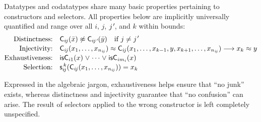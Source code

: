 Datatypes and codatatypes share many basic properties pertaining to
constructors and selectors. All properties below are implicitly universally
quantified and range over all $i$, $j$, $\jPrime$, and $k$ within bounds:
%
\[
\begin{aligned}[t]
\text{Distinctness:}\quad
  & %
    \smash{\const{C}_{i\negvthinspace j}(\bar x) \tneq \const{C}_{i\negvthinspace \jPrime}(\bar y) \quad\text{if $j \not= \jPrime$}}
  \\[-.5\jot]
\text{Injectivity:}\quad
  & %
    \smash{\const{C}_{i\negvthinspace j}(x_1,\ldots,x_{n_{i\negvthinspace j}}) \teq \const{C}_{i\negvthinspace j}(x_1,\ldots,x_{k-1},y,x_{k+1},\ldots,x_{n_{i\negvthinspace j}}) \longrightarrow x_k \teq y}
  \\[-.5\jot]
\text{Exhaustiveness:}\quad
  & \smash{\is{C}_{i1}(x) \mathrel\lor \cdots \mathrel\lor \is{C}_{im_i}(x)}
  \\[-.5\jot]
\text{Selection:}\quad
  & \smash{\const{s}_{i\negvthinspace j}^{\,k}(\const{C}_{i\negvthinspace j}(x_1,\ldots,x_{n_{i\negvthinspace j}})) = x_k}
\end{aligned}
\]
%
\begin{report}%
Expressed in the algebraic jargon, exhaustiveness helps ensure that ``no
junk'' exists, whereas distinctness and injectivity guarantee that ``no
confusion'' can arise.
The result of selectors applied to the wrong
constructor is left completely unspecified.
\end{report}


